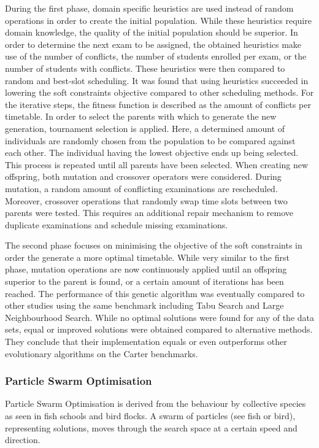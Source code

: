 During the first phase, domain specific heuristics are used instead of random operations in order to create the initial population. While these heuristics require domain knowledge, the quality of the initial population should be superior. In order to determine the next exam to be assigned, the obtained heuristics make use of the number of conflicts, the number of students enrolled per exam, or the number of students with conflicts. These heuristics were then compared to random and best-slot scheduling. It was found that using heuristics succeeded in lowering the soft constraints objective compared to other scheduling methods. For the iterative steps, the fitness function is described as the amount of conflicts per timetable. In order to select the parents with which to generate the new generation, tournament selection is applied. Here, a determined amount of individuals are randomly chosen from the population to be compared against each other. The individual having the lowest objective ends up being selected. This process is repeated until all parents have been selected. When creating new offspring, both mutation and crossover operators were considered. During mutation, a random amount of conflicting examinations are rescheduled. Moreover, crossover operations that randomly swap time slots between two parents were tested. This requires an additional repair mechanism to remove duplicate examinations and schedule missing examinations.

The second phase focuses on minimising the objective of the soft constraints in order the generate a more optimal timetable. While very similar to the first phase,  mutation operations are now continuously applied until an offspring superior to the parent is found, or a certain amount of iterations has been reached. The performance of this genetic algorithm was eventually compared to other studies using the same benchmark including Tabu Search and Large Neighbourhood Search. While no optimal solutions were found for any of the data sets, equal or improved solutions were obtained compared to alternative methods. They conclude that their implementation equals or even outperforms other evolutionary algorithms on the Carter benchmarks.

\subsubsection{Particle Swarm Optimisation}

Particle Swarm Optimisation \cite{kennedy1995} is derived from the behaviour by collective species as seen in fish schools and bird flocks. A swarm of particles (see fish or bird), representing solutions, moves through the search space at a certain speed and direction.

